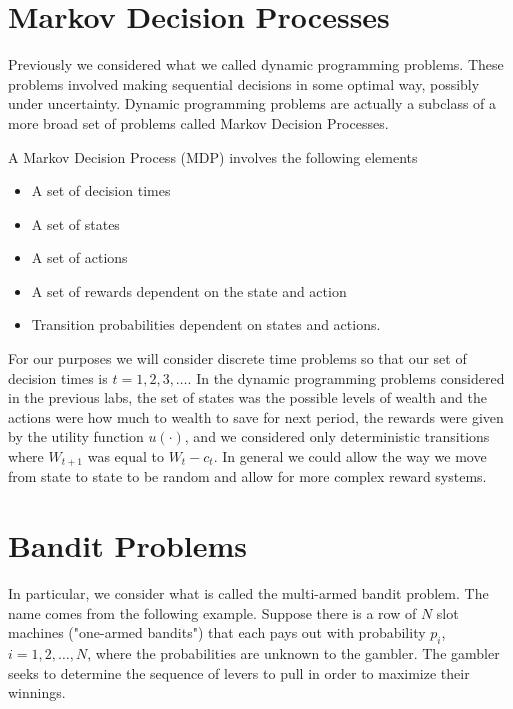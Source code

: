 
\section*{Markov Decision Processes}
Previously we considered what we called dynamic programming problems.  These problems involved making sequential decisions in some optimal way, possibly under uncertainty.  Dynamic programming problems are actually a subclass of a more broad set of problems called Markov Decision Processes.

A Markov Decision Process (MDP) involves the following elements

\begin{itemize}
\item   A set of decision times
\item   A set of states
\item   A set of actions
\item   A set of rewards dependent on the state and action
\item   Transition probabilities dependent on states and actions.
\end{itemize}

For our purposes we will consider discrete time problems so that our set of decision times is $t = 1,2,3,\ldots$.  In the dynamic programming problems considered in the previous labs, the set of states was the possible levels of wealth and the actions were how much to wealth to save for next period, the rewards were given by the utility function $u(\cdot)$, and we considered only deterministic transitions where $W_{t+1}$ was equal to $W_t - c_t$.  In general we could allow the way we move from state to state to be random and allow for more complex reward systems.

\section*{Bandit Problems}
In particular, we consider what is called the multi-armed bandit problem.  The name comes from the following example.  Suppose there is a row of $N$ slot machines ("one-armed bandits") that each pays out with probability $p_i$, $i= 1,2,\ldots,N$, where the probabilities are unknown to the gambler.  The gambler seeks to determine the sequence of levers to pull in order to maximize their winnings.

